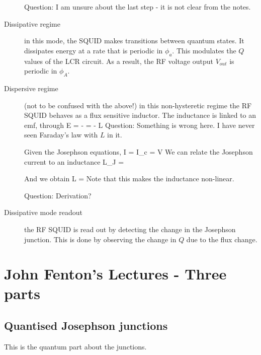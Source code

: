 \begin{description}
Question: I am unsure about the last step - it is not clear from the notes. 

\item[Dissipative regime] in this mode, the SQUID makes transitions between quantum states. It dissipates energy at a rate that is periodic in $\phi_a$. This modulates the $Q$ values of the LCR circuit. As a result, the RF voltage output $V_{out}$ is periodic in $\phi_A$. 



\item[Dispersive regime] (not to be confused with the above!) in this non-hysteretic regime the RF SQUID behaves as a flux sensitive inductor. The inductance is linked to an emf, through
\beq
E = -  = - L 
\eeq
Question: Something is wrong here. I have never seen Faraday's law with $L$ in it. 

Given the Josephson equations, 
\beq
I = I_c \sin{\phi}
\eeq
\beq
{} =  V
\eeq
We can relate the Josephson current to an inductance
\beq
L_J = 
\eeq

And we obtain
\beq
L = 
\eeq
Note that this makes the inductance non-linear. 

Question: Derivation? 

\item[Dissipative mode readout] the RF SQUID is read out by detecting the change in the Josephson junction. This is done by observing the change in $Q$ due to the flux change. 



\end{description}

\section{John Fenton's Lectures - Three parts}
\subsection{Quantised Josephson junctions}
This is the quantum part about the junctions. 

